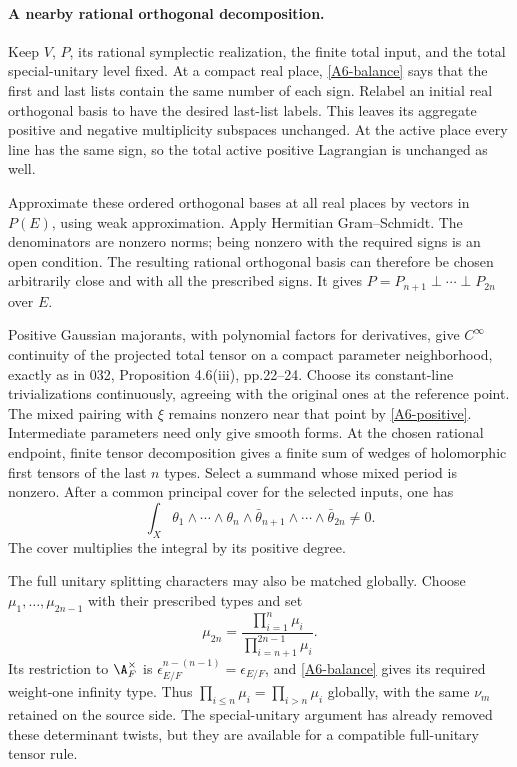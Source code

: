 \documentclass[11pt]{article}
\theoremstyle{definition}\newtheorem{definition}[theorem]{Definition}\newtheorem{remark}[theorem]{Remark}
\begin{document}
\paragraph{A nearby rational orthogonal decomposition.}
Keep $V$, $P$, its rational symplectic realization, the finite total
input, and the total special-unitary level fixed. At a compact real
place, \eqref{A6-balance} says that the first and last lists contain
the same number of each sign. Relabel an initial real orthogonal
basis to have the desired last-list labels. This leaves its aggregate
positive and negative multiplicity subspaces unchanged. At the
active place every line has the same sign, so the total active
positive Lagrangian is unchanged as well.

Approximate these ordered orthogonal bases at all real places by
vectors in $P(E)$, using weak approximation. Apply Hermitian
Gram--Schmidt. The denominators are nonzero norms; being nonzero
with the required signs is an open condition. The resulting
rational orthogonal basis can therefore be chosen arbitrarily close
and with all the prescribed signs. It gives
$P=P_{n+1}\perp\cdots\perp P_{2n}$ over $E$.

Positive Gaussian majorants, with polynomial factors for derivatives,
give $C^\infty$ continuity of the projected total tensor on a compact
parameter neighborhood, exactly as in 032, Proposition 4.6(iii),
pp.22--24. Choose its constant-line trivializations continuously,
agreeing with the original ones at the reference point. The mixed
pairing with $\xi$ remains nonzero near that point by
\eqref{A6-positive}. Intermediate parameters need only give smooth
forms. At the chosen rational endpoint, finite tensor decomposition
gives a finite sum of wedges of holomorphic first tensors of the last
$n$ types. Select a summand whose mixed period is nonzero. After
a common principal cover for the selected inputs, one has
\begin{equation}\label{A6-period}
 \int_X\theta_1\wedge\cdots\wedge\theta_n
       \wedge\bar\theta_{n+1}\wedge\cdots\wedge\bar\theta_{2n}
        \ne0.
\end{equation}
The cover multiplies the integral by its positive degree.

The full unitary splitting characters may also be matched globally.
Choose $\mu_1,\ldots,\mu_{2n-1}$ with their prescribed types and set
\[
 \mu_{2n}=\frac{\prod_{i=1}^n\mu_i}
                    {\prod_{i=n+1}^{2n-1}\mu_i}.
\]
Its restriction to $\A_F^\times$ is
$\epsilon_{E/F}^{n-(n-1)}=\epsilon_{E/F}$, and
\eqref{A6-balance} gives its required weight-one infinity type.
Thus $\prod_{i\leq n}\mu_i=\prod_{i>n}\mu_i$ globally, with the
same $\nu_m$ retained on the source side. The special-unitary
argument has already removed these determinant twists, but they
are available for a compatible full-unitary tensor rule.
\end{document}
